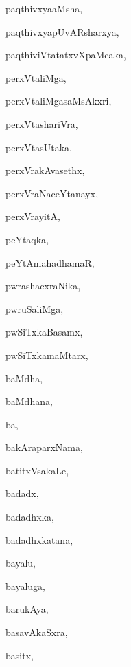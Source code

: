 \begin{multicols}{3}
{\noindent
{paqthivxyaaMsha}, \pageref{paqthivxyaaMsha}

\noindent
{paqthivxyapUvARsharxya}, \pageref{paqthivxyapUvARsharxya}

\noindent
{paqthiviVtatatxvXpaMcaka}, \pageref{paqthiviVtatatxvXpaMcaka}

\noindent
{perxVtaliMga}, \pageref{perxVtaliMga}

\noindent
{perxVtaliMgasaMsAkxri}, \pageref{perxVtaliMgasaMsAkxri}

\noindent
{perxVtashariVra}, \pageref{perxVtashariVra}

\noindent
{perxVtasUtaka}, \pageref{perxVtasUtaka}

\noindent
{perxVrakAvasethx}, \pageref{perxVrakAvasethx}

\noindent
{perxVraNaceYtanayx}, \pageref{perxVraNaceYtanayx}

\noindent
{perxVrayitA}, \pageref{perxVrayitA}

\noindent
{peYtaqka}, \pageref{peYtaqka}

\noindent
{peYtAmahadhamaR}, \pageref{peYtAmahadhamaR}

\noindent
{pwrashacxraNika}, \pageref{pwrashacxraNika}

\noindent
{pwruSaliMga}, \pageref{pwruSaliMga}

\noindent
{pwSiTxkaBasamx}, \pageref{pwSiTxkaBasamx}

\noindent
{pwSiTxkamaMtarx}, \pageref{pwSiTxkamaMtarx}

\noindent
{baMdha}, \pageref{baMdha}

\noindent
{baMdhana}, \pageref{baMdhana}

\noindent
{ba}, \pageref{ba}

\noindent
{bakAraparxNama}, \pageref{bakAraparxNama}

\noindent
{batitxVsakaLe}, \pageref{batitxVsakaLe}

\noindent
{badadx}, \pageref{badadx}

\noindent
{badadhxka}, \pageref{badadhxka}

\noindent
{badadhxkatana}, \pageref{badadhxkatana}

\noindent
{bayalu}, \pageref{bayalu}

\noindent
{bayaluga}, \pageref{bayaluga}

\noindent
{barukAya}, \pageref{barukAya}

\noindent
{basavAkaSxra}, \pageref{basavAkaSxra}

\noindent
{basitx}, \pageref{basitx}

}
\end{multicols}
